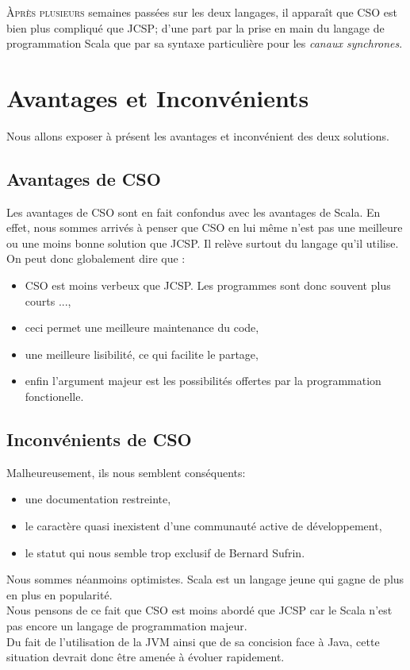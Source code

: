 \documentclass[a4paper,11pt,french]{report}
\begin{document}
\lettrine{\`A}{près plusieurs} semaines passées sur les deux langages, il appara\^it que CSO est bien plus compliqué que JCSP; d'une part par la prise en main du langage de programmation Scala que par sa syntaxe particulière pour les \emph{canaux synchrones}.\\

\section{Avantages et Inconvénients}
Nous allons exposer à présent les avantages et inconvénient des deux solutions.

\subsection{Avantages de CSO}
Les avantages de CSO sont en fait confondus avec les avantages de Scala. En effet, nous sommes arrivés à penser que CSO en lui m\^eme n'est pas une meilleure ou une moins bonne solution que JCSP. Il relève surtout du langage qu'il utilise. On peut donc globalement dire que :
\begin{itemize}
\item CSO est moins verbeux que JCSP. Les programmes sont donc souvent plus courts ...,
\item ceci permet une meilleure maintenance du code,
\item une meilleure lisibilité, ce qui facilite le partage,
\item enfin l'argument majeur est les possibilités offertes par la programmation fonctionelle.
\end{itemize}

\subsection{Inconvénients de CSO}
Malheureusement, ils nous semblent conséquents:
 \begin{itemize}
\item une documentation restreinte,
\item le caractère quasi inexistent d'une communauté active de développement,
\item le statut qui nous semble trop exclusif de Bernard Sufrin.
\end{itemize}

Nous sommes néanmoins optimistes.  Scala est un langage jeune qui gagne de plus en plus en popularité.\\
Nous pensons de ce fait que CSO est moins abordé que JCSP car le Scala n'est pas encore un langage de programmation majeur.\\
Du fait de l'utilisation de la JVM ainsi que de sa concision face à Java, cette situation devrait donc être amenée à évoluer rapidement.
\end{document}
